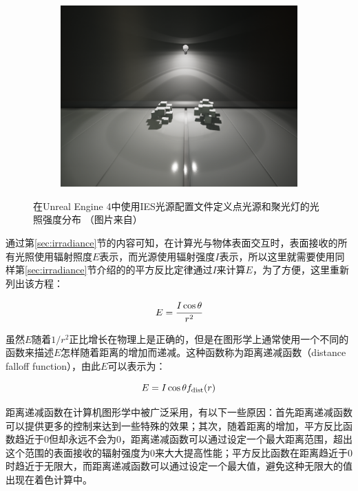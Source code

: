 \begin{figure}
\begin{fullwidth}
\begin{subfigure}[b]{0.247\thewidth}
	\end{subfigure}
	\begin{subfigure}[b]{0.293\thewidth}
		\includegraphics[width=1.\textwidth]{figures/intro/IES_04}
	\end{subfigure}
\caption{在Unreal Engine 4中使用IES光源配置文件定义点光源和聚光灯的光照强度分布 （图片来自\cite{m:IESLightProfiles}）}
\label{f:intro-ies}
\end{fullwidth}
\end{figure}

通过第\ref{sec:irradiance}节的内容可知，在计算光与物体表面交互时，表面接收的所有光照使用辐射照度$E$表示，而光源使用辐射强度$I$表示，所以这里就需要使用同样第\ref{sec:irradiance}节介绍的的平方反比定律通过$I$来计算$E$，为了方便，这里重新列出该方程：

\begin{equation}
	E= \cfrac{I\cos\theta}{r^{2}}
\end{equation}

\noindent 虽然$E$随着$1/r^{2}$正比增长在物理上是正确的，但是在图形学上通常使用一个不同的函数来描述$E$怎样随着距离的增加而递减。这种函数称为距离递减函数（distance falloff function），由此$E$可以表示为：

\begin{equation}
	E=I\cos\theta f_{\rm dist}(r)
\end{equation}

距离递减函数在计算机图形学中被广泛采用，有以下一些原因：首先距离递减函数可以提供更多的控制来达到一些特殊的效果；其次，随着距离的增加，平方反比函数趋近于$0$但却永远不会为$0$，距离递减函数可以通过设定一个最大距离范围，超出这个范围的表面接收的辐射强度为0来大大提高性能；平方反比函数在距离趋近于$0$时趋近于无限大，而距离递减函数可以通过设定一个最大值，避免这种无限大的值出现在着色计算中。

